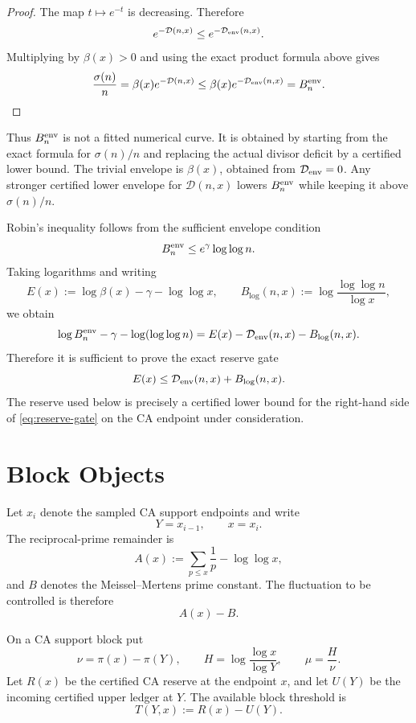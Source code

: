 \documentclass[11pt,a4paper]{article}
\begin{document}
\begin{proof}
The map \(t\mapsto e^{-t}\) is decreasing. Therefore
\[
  e^{-\mathcal D(n,x)}
  \le
  e^{-\mathcal D_{\rm env}(n,x)}.
\]
Multiplying by \(\beta(x)>0\) and using the exact product formula above gives
\[
  \frac{\sigma(n)}{n}
  =
  \beta(x)e^{-\mathcal D(n,x)}
  \le
  \beta(x)e^{-\mathcal D_{\rm env}(n,x)}
  =
  B_n^{\rm env}.
\]
\end{proof}

Thus \(B_n^{\rm env}\) is not a fitted numerical curve. It is obtained by
starting from the exact formula for \(\sigma(n)/n\) and replacing the actual
divisor deficit by a certified lower bound. The trivial envelope is
\(\beta(x)\), obtained from \(\mathcal D_{\rm env}=0\). Any stronger certified
lower envelope for \(\mathcal D(n,x)\) lowers \(B_n^{\rm env}\) while keeping
it above \(\sigma(n)/n\).

Robin's inequality follows from the sufficient envelope condition
\[
  B_n^{\rm env}\le e^\gamma\log\log n.
\]
Taking logarithms and writing
\[
  E(x):=\log\beta(x)-\gamma-\log\log x,
  \qquad
  B_{\log}(n,x):=
  \log\frac{\log\log n}{\log x},
\]
we obtain
\[
  \log B_n^{\rm env}
  -\gamma-\log(\log\log n)
  =
  E(x)-\mathcal D_{\rm env}(n,x)-B_{\log}(n,x).
\]
Therefore it is sufficient to prove the exact reserve gate
\begin{equation}\label{eq:reserve-gate}
  E(x)\le
  \mathcal D_{\rm env}(n,x)+B_{\log}(n,x).
\end{equation}
The reserve used below is precisely a certified lower bound for the right-hand
side of \eqref{eq:reserve-gate} on the CA endpoint under consideration.

\section{Block Objects}

Let \(x_i\) denote the sampled CA support endpoints and
write
\[
  Y=x_{i-1},\qquad x=x_i.
\]
The reciprocal-prime remainder is
\[
  A(x):=\sum_{p\le x}\frac1p-\log\log x,
\]
and \(B\) denotes the Meissel--Mertens prime constant. The fluctuation to be
controlled is therefore
\[
  A(x)-B.
\]

On a CA support block put
\[
  \nu=\pi(x)-\pi(Y),\qquad
  H=\log\frac{\log x}{\log Y},\qquad
  \mu=\frac{H}{\nu}.
\]
Let \(R(x)\) be the certified CA reserve at the endpoint \(x\), and let
\(U(Y)\) be the incoming certified upper ledger at \(Y\). The available block
threshold is
\[
  T(Y,x):=R(x)-U(Y).
\]
\end{document}
